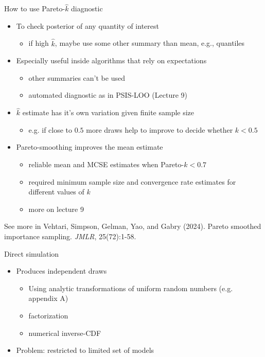 \documentclass[english,t]{beamer}
\begin{document}
\begin{frame}{How to use Pareto-$\hat{k}$ diagnostic}


  \begin{itemize}
  \item<+-> To check posterior of any quantity of interest
    \begin{itemize}
    \item if high $\hat{k}$, maybe use some other summary than mean,
      e.g., quantiles
    \end{itemize}
  \item<+-> Especially useful inside algorithms that rely on
    expectations
    \begin{itemize}
    \item other summaries can't be used
    \item automated diagnostic as in PSIS-LOO (Lecture 9)
    \end{itemize}
  \item<+-> $\hat{k}$ estimate has it's own variation given finite sample size
    \begin{itemize}
    \item e.g. if close to $0.5$ more draws help to improve to decide
      whether $k<0.5$
    \end{itemize}
  \item<+-> Pareto-smoothing improves the mean estimate
    \begin{itemize}
    \item reliable mean and MCSE estimates when Pareto-$k<0.7$
    \item required minimum sample size and convergence rate estimates
      for different values of $k$
    \item more on lecture 9
    \end{itemize}
  \end{itemize}

  \vfill
  {\small\color{gray}
  See more in Vehtari, Simpson, Gelman, Yao, and Gabry (2024). Pareto
  smoothed importance sampling. \textit{JMLR}, 25(72):1-58.}
  
\end{frame}


\begin{frame}{Direct simulation}

  \begin{itemize}
  \item Produces independent draws
    \begin{itemize}
    \item Using analytic transformations of uniform random numbers
      (e.g. appendix A)
    \item factorization
    \item numerical inverse-CDF
    \end{itemize}
  \item Problem: restricted to limited set of models
  \end{itemize}

\end{frame}
\end{document}
